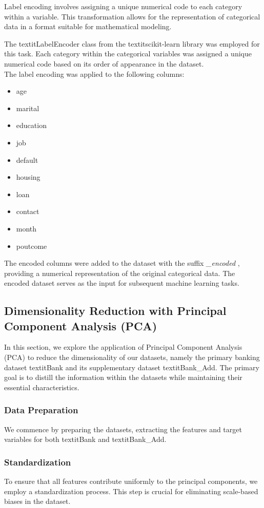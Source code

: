 \documentclass{article}
\begin{document}
Label encoding involves assigning a unique numerical code to each category within a variable. This transformation allows for the representation of categorical data in a format suitable for mathematical modeling.

The textit{LabelEncoder} class from the textit{scikit-learn} library was employed for this task. Each category within the categorical variables was assigned a unique numerical code based on its order of appearance in the dataset.
\\
The label encoding was applied to the following columns:
\begin{itemize}
    \item age
    \item marital
    \item education
    \item job
    \item default
    \item housing
    \item loan
    \item contact
    \item month
    \item poutcome
\end{itemize}

The encoded columns were added to the dataset with the suffix \textit{\_encoded} , providing a numerical representation of the original categorical data.
The encoded dataset serves as the input for subsequent machine learning tasks.

\subsection{ Dimensionality Reduction with Principal Component Analysis (PCA)}

In this section, we explore the application of Principal Component Analysis (PCA) to reduce the dimensionality of our datasets, namely the primary banking dataset textit{Bank} and its supplementary dataset textit{Bank\_Add}. The primary goal is to distill the information within the datasets while maintaining their essential characteristics.

\subsubsection{ Data Preparation}
We commence by preparing the datasets, extracting the features and target variables for both textit{Bank} and textit{Bank\_Add}.
\subsubsection{Standardization}
To ensure that all features contribute uniformly to the principal components, we employ a standardization process. This step is crucial for eliminating scale-based biases in the dataset.
\end{document}
